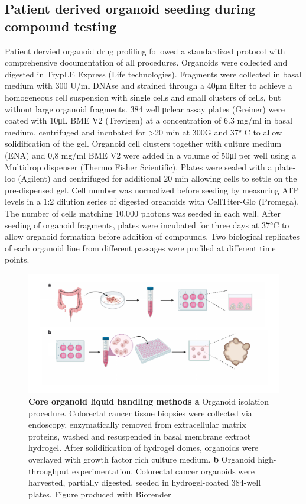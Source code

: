 \begin{flushleft}
\subsection{Patient derived organoid seeding during compound testing}
Patient dervied organoid drug profiling followed a standardized protocol with comprehensive documentation of all procedures. Organoids were collected and digested in TrypLE Express (Life technologies). Fragments were collected in basal medium with 300 U/ml DNAse and strained through a 40μm filter to achieve a homogeneous cell suspension with single cells and small clusters of cells, but without large organoid fragments. 384 well μclear assay plates (Greiner) were coated with 10μL BME V2 (Trevigen) at a concentration of 6.3 mg/ml in basal medium, centrifuged and incubated for >20 min at 300G and 37° C to allow solidification of the gel. Organoid cell clusters together with culture medium (ENA) and 0,8 mg/ml BME V2 were added in a volume of 50μl per well using a Multidrop dispenser (Thermo Fisher Scientific). Plates were sealed with a plate-loc (Agilent) and centrifuged for additional 20 min allowing cells to settle on the pre-dispensed gel. Cell number was normalized before seeding by measuring ATP levels in a 1:2 dilution series of digested organoids with CellTiter-Glo (Promega). The number of cells matching 10,000 photons was seeded in each well. After seeding of organoid fragments, plates were incubated for three days at 37°C to allow organoid formation before addition of compounds. Two biological replicates of each organoid line from different passages were profiled at different time points.

\begin{figure}[h!]
\centering
\includegraphics[width=\textwidth,
                height=\textheight,
                keepaspectratio]{figures/promise/pdf/fig_0_1.pdf}
\caption[Core organoid liquid handling methods]{\textbf{Core organoid liquid handling methods a} Organoid isolation procedure. Colorectal cancer tissue biopsies were collected via endoscopy, enzymatically removed from extracellular matrix proteins, washed and resuspended in basal membrane extract hydrogel. After solidification of hydrogel domes, organoids were overlayed with growth factor rich culture medium. \textbf{b} Organoid high-throughput experimentation. Colorectal cancer organoids were harvested, partially digested, seeded in hydrogel-coated 384-well plates. Figure produced with Biorender}
\label{fig_110}
\end{figure}


\end{flushleft}
